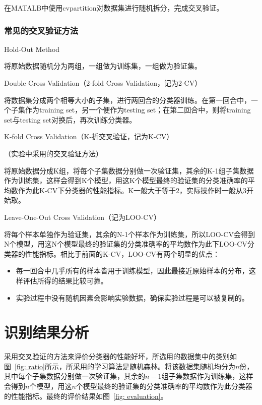 \documentclass[12pt]{article}
\begin{document}
        在MATALB中使用cvpartition对数据集进行随机拆分，完成交叉验证。
        
\subsubsection{常见的交叉验证方法}

\begin{itemize}
    \item Hold-Out Method
    
    将原始数据随机分为两组，一组做为训练集，一组做为验证集。
    \item Double Cross Validation（2-fold Cross Validation，记为2-CV）
    
    将数据集分成两个相等大小的子集，进行两回合的分类器训练。在第一回合中，一个子集作为training set，另一个便作为testing set；在第二回合中，则将training set与testing set对换后，再次训练分类器。
    {\color{blue}\item K-fold Cross Validation（K-折交叉验证，记为K-CV）}（实验中采用的交叉验证方法）
    
    将原始数据分成K组，将每个子集数据分别做一次验证集，其余的K-1组子集数据作为训练集，这样会得到K个模型，用这K个模型最终的验证集的分类准确率的平均数作为此K-CV下分类器的性能指标。K一般大于等于2，实际操作时一般从3开始取。
    \item Leave-One-Out Cross Validation（记为LOO-CV）
    
    将每个样本单独作为验证集，其余的N-1个样本作为训练集，所以LOO-CV会得到N个模型，用这N个模型最终的验证集的分类准确率的平均数作为此下LOO-CV分类器的性能指标。相比于前面的K-CV，LOO-CV有两个明显的优点：
    \begin{itemize}
        \item 每一回合中几乎所有的样本皆用于训练模型，因此最接近原始样本的分布，这样评估所得的结果比较可靠。
        \item 实验过程中没有随机因素会影响实验数据，确保实验过程是可以被复制的。
    \end{itemize}
\end{itemize}

\section{识别结果分析}

采用交叉验证的方法来评价分类器的性能好坏，所选用的数据集中的类别如图~\ref{fig: ratio}所示，所采用的学习算法是随机森林。将该数据集随机均分为$n$份，其中每个子集数据分别做一次验证集，其余的$n-1$组子集数据作为训练集，这样会得到$n$个模型，用这$n$个模型最终的验证集的分类准确率的平均数作为此分类器的性能指标。最终的评价结果如图~\ref{fig: evaluation}。
\end{document}
